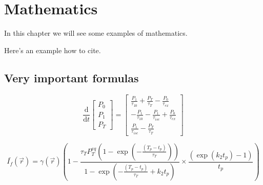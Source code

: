 \chapter{Mathematics}
In this chapter we will see some examples of mathematics.

Here's an example how to cite.~\cite{debiePerformanceSevenECG2020}

\lipsum[1]

\section{Very important formulas}
\lipsum[2]

\begin{equation}\label{eqn:rate_eqns}
\frac{\textrm{d}}{\textrm{d}t}\left[
\begin{array}{l}
P_{\textit{0}} \\
P_{\textit{1}} \\
P_{\textit{T}}
\end{array}
\right] =
\left[
\begin{array}{l}
\frac{P_{\textit{1}}}{\tau_{\textit{10}}} + \frac{P_{\textit{T}}}{\tau_{\textit{T}}} - \frac{P_{\textit{0}}}{\tau_{\textit{ex}}} \\
- \frac{P_{\textit{1}}}{\tau_{\textit{10}}} - \frac{P_{\textit{1}}}{\tau_{isc}} + \frac{P_{\textit{0}}}{\tau_{\textit{ex}}} \\
\frac{P_{\textit{1}}}{\tau_{isc}} -  \frac{P_{\textit{T}}}{\tau_{\textit{T}}}
\end{array}
\right]
\end{equation}

\lipsum[3]


\begin{equation}\label{eqn:avgfluorescence}
\bar{I_{f}}(\vec{r})
	= \gamma(\vec{r}) \left(1 - \frac{\tau_{\textit{T}} P_{\textit{T}}^{{eq}}\left(1-\exp \left(-\frac{(T_p - t_p)}{\tau_{\textit{T}}}\right)\right)}{1-\exp\left(-\frac{(T_p - t_p)}{\tau_{\textit{T}}} + k_{\textit{2}} t_p\right)} \times \frac{\left(\exp\left(k_{\textit{2}} t_p\right)-1\right)}{t_p} \right)
\end{equation}

\lipsum[3]

